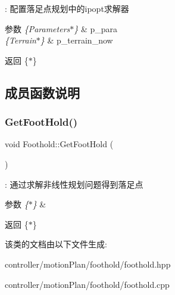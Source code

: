 \+: 配置落足点规划中的ipopt求解器 
\begin{DoxyParams}{参数}
{\em \{\+Parameters$\ast$\}} & p\+\_\+para \\
\hline
{\em \{\+Terrain$\ast$\}} & p\+\_\+terrain\+\_\+now \\
\hline
\end{DoxyParams}
\begin{DoxyReturn}{返回}
\{$\ast$\} 
\end{DoxyReturn}


\subsection{成员函数说明}
\mbox{\label{classquadruped_1_1Foothold_a3731827dcb2f4e75e3ff701f0b04d962}} 
\subsubsection{\texorpdfstring{Get\+Foot\+Hold()}{GetFootHold()}}
{\footnotesize\ttfamily void Foothold\+::\+Get\+Foot\+Hold (\begin{DoxyParamCaption}\item[{void}]{ }\end{DoxyParamCaption})}

\+: 通过求解非线性规划问题得到落足点 
\begin{DoxyParams}{参数}
{\em \{$\ast$\}} & \\
\hline
\end{DoxyParams}
\begin{DoxyReturn}{返回}
\{$\ast$\} 
\end{DoxyReturn}


该类的文档由以下文件生成\+:\begin{DoxyCompactItemize}
\item 
controller/motion\+Plan/foothold/foothold.\+hpp\item 
controller/motion\+Plan/foothold/foothold.\+cpp\end{DoxyCompactItemize}
